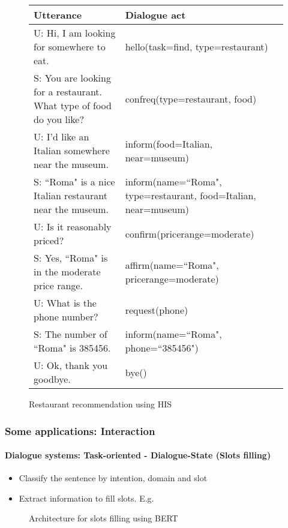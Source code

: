 \documentclass[xcolor=table]{beamer}
\begin{document}
\begin{frame}
\begin{figure}
		\begin{tabular}{p{}p{}}
			\hline
			Utterance & Dialogue act\\
			\hline
			U: Hi, I am looking for somewhere to eat.  & hello(task=find, type=restaurant) \\
			S: You are looking for a restaurant. What type of food do you like?  & confreq(type=restaurant, food) \\
			U: I'd like an Italian somewhere near the museum. & inform(food=Italian, near=museum)\\
			S: ``Roma" is a nice Italian restaurant near the museum.  & inform(name=``Roma", type=restaurant, food=Italian, near=museum) \\
			U: Is it reasonably priced? & confirm(pricerange=moderate) \\
			S: Yes, ``Roma" is in the moderate price range.  & affirm(name=``Roma", pricerange=moderate) \\
			U: What is the phone number? & request(phone) \\
			S: The number of ``Roma" is 385456. & inform(name=``Roma", phone=``385456") \\
			U: Ok, thank you goodbye. & bye() \\
			\hline
		\end{tabular}
		
		\caption{\vspace{-1cm}Restaurant recommendation using HIS \cite{2010-young-al}}
	\end{figure}
	
\end{frame}

\begin{frame}
	\frametitle{Some applications: Interaction}
	\framesubtitle{Dialogue systems: Task-oriented - Dialogue-State (Slots filling)}
	
	\begin{itemize}
		\item Classify the sentence by intention, domain and slot
		\item Extract information to fill slots. E.g. 
	\end{itemize}
	
	\begin{figure}
		\centering
		\caption{Architecture for slots filling using BERT \cite{2020-jurafsky-martin}}
	\end{figure}
	
\end{frame}
\end{document}
